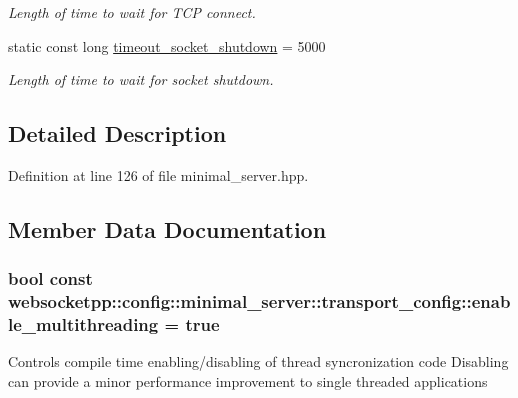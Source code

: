 \begin{DoxyCompactItemize}
\begin{DoxyCompactList}\small\item\em Length of time to wait for T\+CP connect. \end{DoxyCompactList}\item 
static const long \hyperlink{structwebsocketpp_1_1config_1_1minimal__server_1_1transport__config_a100202545acd0d397d0462eb87e61b6c}{timeout\+\_\+socket\+\_\+shutdown} = 5000\hypertarget{structwebsocketpp_1_1config_1_1minimal__server_1_1transport__config_a100202545acd0d397d0462eb87e61b6c}{}\label{structwebsocketpp_1_1config_1_1minimal__server_1_1transport__config_a100202545acd0d397d0462eb87e61b6c}

\begin{DoxyCompactList}\small\item\em Length of time to wait for socket shutdown. \end{DoxyCompactList}\end{DoxyCompactItemize}


\subsection{Detailed Description}


Definition at line 126 of file minimal\+\_\+server.\+hpp.



\subsection{Member Data Documentation}
\subsubsection[{\texorpdfstring{enable\+\_\+multithreading}{enable\_multithreading}}]{\setlength{\rightskip}{0pt plus 5cm}bool const websocketpp\+::config\+::minimal\+\_\+server\+::transport\+\_\+config\+::enable\+\_\+multithreading = true\hspace{0.3cm}{\ttfamily [static]}}\hypertarget{structwebsocketpp_1_1config_1_1minimal__server_1_1transport__config_a5103f390ba217818bc49b2509650c04a}{}\label{structwebsocketpp_1_1config_1_1minimal__server_1_1transport__config_a5103f390ba217818bc49b2509650c04a}
Controls compile time enabling/disabling of thread syncronization code Disabling can provide a minor performance improvement to single threaded applications 

